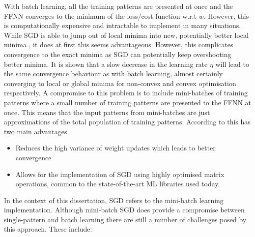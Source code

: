 With batch learning, all the training patterns are presented at once and the \ac{FFNN} converges to the minimum of the loss/cost function w.r.t $w$. However, this is computationally expensive and intractable to implement in many situations. While \ac{SGD} is able to jump out of local minima into new, potentially better local minima \cite{ref:ruder:2016}, it does at first this seems advantageous. However, this complicates convergence to the exact minima as \ac{SGD} can potentially keep overshooting better minima. It is shown that a slow decrease in the learning rate $\eta$ will lead to the same convergence behaviour as with batch learning, almost certainly converging to local or global minima for non-convex and convex optimisation respectively. A compromise to this problem is to include mini-batches of training patterns where a small number of training patterns are presented to the \ac{FFNN} at once. This means that the input patterns from mini-batches are just approximations of the total population of training patterns. According to \citeauthor{ref:ruder:2016} \cite{ref:ruder:2016} this has two main advantages

\begin{itemize}
      \item Reduces the high variance of weight updates which leads to better convergence
      \item Allows for the implementation of \ac{SGD} using highly optimised matrix operations, common to the state-of-the-art \ac{ML} libraries used today.
\end{itemize}

In the context of this dissertation, \ac{SGD} refers to the mini-batch learning implementation. Although mini-batch \ac{SGD} does provide a compromise between single-pattern and batch learning there are still a number of challenges posed by this approach. These include:

